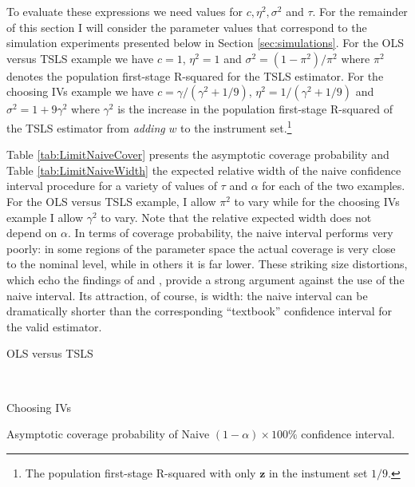 To evaluate these expressions we need values for $c, \eta^2, \sigma^2$ and $\tau$.
For the remainder of this section I will consider the parameter values that correspond to the simulation experiments presented below in Section \ref{sec:simulations}.
For the OLS versus TSLS example we have $c=1$, $\eta^2=1$ and $\sigma^2 = (1-\pi^2)/\pi^2$ where $\pi^2$ denotes the population first-stage R-squared for the TSLS estimator. 
For the choosing IVs example we have $c =\gamma/(\gamma^2 +1/9)$, $\eta^2 = 1/(\gamma^2 + 1/9)$ and $\sigma^2 = 1 + 9\gamma^2$ where $\gamma^2$ is the increase in the population first-stage R-squared of the TSLS estimator from \emph{adding} $w$ to the instrument set.\footnote{The population first-stage R-squared with only $\mathbf{z}$ in the instument set $1/9$.}

Table \ref{tab:LimitNaiveCover} presents the asymptotic coverage probability and Table \ref{tab:LimitNaiveWidth} the expected relative width of the naive confidence interval procedure for a variety of values of $\tau$ and $\alpha$ for each of the two examples.
For the OLS versus TSLS example, I allow $\pi^2$ to vary while for the choosing IVs example I allow $\gamma^2$ to vary.
Note that the relative expected width does not depend on $\alpha$.
In terms of coverage probability, the naive interval performs very poorly: in some regions of the parameter space the actual coverage is very close to the nominal level, while in others it is far lower.
These striking size distortions, which echo the findings of \cite{Guggenberger2010} and \cite{Guggenberger2012}, provide a strong argument against the use of the naive interval.
Its attraction, of course, is width: the naive interval can be dramatically shorter than the corresponding ``textbook'' confidence interval for the valid estimator.

\begin{table}[h]
  \centering
  \begin{subtable}{0.48\textwidth}
    \caption{OLS versus TSLS}
    
  \end{subtable}
  ~
  \begin{subtable}{0.48\textwidth}
    \caption{Choosing IVs}
    
  \end{subtable}
  \caption{Asymptotic coverage probability of Naive $(1-\alpha)\times 100\%$ confidence interval.}
  \label{tab:LimitNaiveCover}
\end{table}

